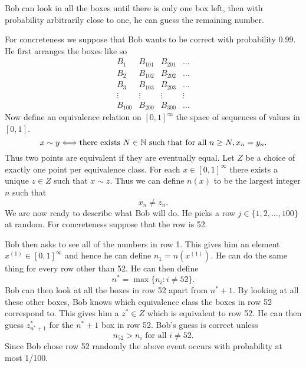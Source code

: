\begin{claim}
    Bob can look in all the boxes until there is only one box left, then with probability arbitrarily close to one, he can guess the remaining number.
\end{claim}
For concreteness we suppose that Bob wants to be correct with probability $0.99$. He first arranges the boxes like so 
\[\begin{matrix}
    B_1&B_{101}&B_{201}&\ldots \\
    B_2&B_{102}&B_{202}&\ldots \\
    B_3&B_{103}&B_{203}&\ldots \\
    \vdots&\vdots&\vdots&\vdots \\
    B_{100}&B_{200}&B_{300}&\ldots 
\end{matrix} \]
Now define an equivalence relation on $[0,1]^\infty$ the space of sequences of values in $[0,1]$. 
\[x \sim y \Longleftrightarrow \text{there exists } N \in {{\mathbb N}} \text{ such that for all } n \ge N, x_n = y_n. \]
Thus two points are equivalent if they are eventually equal. Let $Z$ be a choice of exactly one point per equivalence class. For each $x \in [0,1]^\infty$ there exists a unique $z \in Z$ such that $x \sim z$. Thus we can define $n(x)$ to be the largest integer $n$ such that 
\[x_n \neq z_n. \]
We are now ready to describe what Bob will do. He picks a row $j \in \{1,2,\ldots,100\}$ at random. For concreteness suppose that the row is 52. 

Bob then asks to see all of the numbers in row 1. This gives him an element $x^{(1)} \in [0,1]^\infty$ and hence he can define $n_1 = n(x^{(1)})$. He can do the same thing for every row other than 52. He can then define
\[n^* = \max\{n_i : i \neq 52\}. \]
Bob can then look at all the boxes in row 52 apart from $n^*+1$. By looking at all these other boxes, Bob knows which equivalence class the boxes in row 52 correspond to. This gives him a $z^* \in Z$ which is equivalent to row 52. He can then guess $z^*_{n^*+1}$ for the $n^*+1$ box in row 52. Bob's guess is correct unless
\[n_{52} > n_i \text{ for all } i \neq 52. \]
Since Bob chose row 52 randomly the above event occurs with probability at most 1/100.
